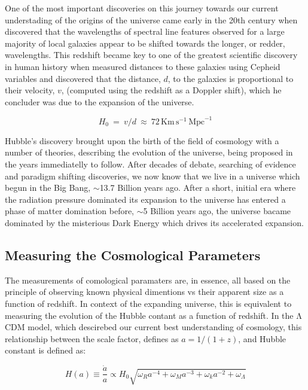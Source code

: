 One of the most important discoveries on this journey towards our current understading of the origins of the universe came early in the 20th century when \citep{Slipher1915} discovered that the wavelengths of spectral line features observed for a large majority of local galaxies appear to be shifted towards the longer, or redder, wavelengths. This redshift became key to one of the greatest scientific discovery in human history when \citep{Hubble1929} measured distances to these galaxies using Cepheid variables and discovered that the distance, $d$, to the galaxies is proportional to their velocity, $v$, (computed using the redshift as a Doppler shift), which he concluder was due to the expansion of the universe.

\begin{equation}
H_0~=~v/d~\approx~72\,\mathrm{Km}\,\mathrm{s}^{-1}\,\mathrm{Mpc}^{-1}
\end{equation}

Hubble's discovery brought upon the birth of the field of cosmology with a number of theories, describing the evolution of the universe, being proposed in the years immediatelly to follow. After decades of debate, searching of evidence and paradigm shifting discoveries, we now \citep{Adam2016} know that we live in a universe which begun in the Big Bang,  $\sim$13.7 Billion years ago. After a short, initial era where the radiation pressure dominated its expansion to the universe has entered a phase of matter domination before, $\sim$5 Billion years ago, the universe bacame dominated by the misterious Dark Energy which drives its accelerated expansion.

\subsection{Measuring the Cosmological Parameters}
The measurements of comological paramaters are, in essence, all based on the principle of observing known physical dimentions vs their apparent size as a function of redshift. In context of the expanding universe, this is equivalent to measuring the evolution of the Hubble contant as a function of redshift. In the $\mathrm{\Lambda}$CDM model, which descirebed our current best understanding of cosmology, this relationship between the scale factor, defines as $a = 1 / (1 + z)$, and Hubble constant is defined as:

\begin{equation} \label{eq:ScaleFactor}
  H(a) \equiv \frac{\dot{a}}{a} \propto H_0 \sqrt{\omega_{R}a^{-4} + \omega_{M}a^{-3} + \omega_{k}a^{-2} + \omega_{\Lambda}}
\end{equation}

